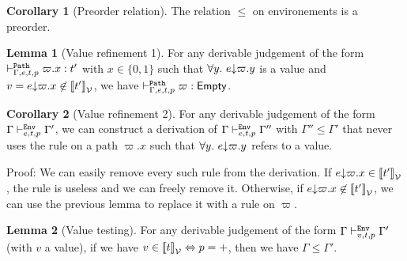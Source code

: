 \documentclass[a4paper]{article}
\theoremstyle{definition}
\newtheorem{lemma}{Lemma}
\newtheorem{corollary}{Corollary}
\begin{document}
        \begin{corollary}[Preorder relation]
          The relation $\leq$ on environements is a preorder.
        \end{corollary}

        \begin{lemma}[Value refinement 1]
          For any derivable judgement of the form $\pvdash \Gamma p e t \varpi.x:t'$ with $x\in\{0,1\}$ such that $\forall y.\ \occ e {\varpi.y}$ is a value
          and $v = \occ e {\varpi.x} \not\in \valsemantic{t'}$, we have $\pvdash \Gamma p e t \varpi:\Empty$.
        \end{lemma}

        \begin{corollary}[Value refinement 2]
          For any derivable judgement of the form $\Gamma \evdash p e t \Gamma'$, we can construct a derivation of $\Gamma \evdash p e t \Gamma''$ with $\Gamma''\leq\Gamma'$
          that never uses the rule  on a path $\varpi.x$ such that $\forall y.\ \occ e {\varpi.y}$ refers to a value.
        \end{corollary}
        Proof: We can easily remove every such rule from the derivation. If $\occ e {\varpi.x} \in \valsemantic{t'}$, the  rule is useless
        and we can freely remove it. Otherwise, if $\occ e {\varpi.x} \not\in \valsemantic{t'}$, we can use the previous lemma to
        replace it with a  rule on $\varpi$.

        \begin{lemma}[Value testing]
          For any derivable judgement of the form $\Gamma \evdash p v t \Gamma'$ (with $v$ a value), if we have $v \in \valsemantic{t} \Leftrightarrow p=+$,
          then we have $\Gamma\leq\Gamma'$.
        \end{lemma}
\end{document}
